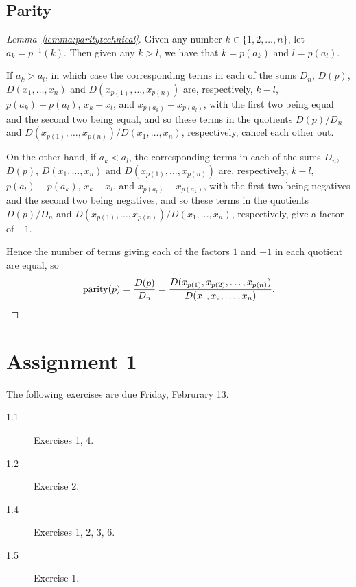 \subsection{Parity}\label{subsection:parity}

\begin{proof}[Lemma~\ref{lemma:paritytechnical}]
  Given any number $k \in \{1, 2, \ldots, n\}$, let $a_{k} = p^{-1}(k)$.
  Then given any $k > l$, we have that $k = p(a_{k})$ and $l = p(a_{l})$.
  
  If $a_{k} > a_{l}$, in which case the corresponding terms in each of the
  sums $D_{n}$, $D(p)$, $D(x_{1}, \ldots, x_{n})$ and $D(x_{p(1)}, \ldots,
  x_{p(n)})$ are, respectively, $k - l$, $p(a_{k}) - p(a_{l})$, $x_{k} - x_{l}$,
  and $x_{p(a_{k})} - x_{p(a_{l})}$, with the first two being equal and the
  second two being equal, and so these terms in the quotients $D(p)/D_{n}$
  and $D(x_{p(1)}, \ldots, x_{p(n)})/D(x_{1}, \ldots, x_{n})$, respectively,
  cancel each other out.

  On the other hand, if $a_{k} < a_{l}$, the corresponding terms in each of the
  sums $D_{n}$, $D(p)$, $D(x_{1}, \ldots, x_{n})$ and $D(x_{p(1)}, \ldots,
  x_{p(n)})$ are, respectively, $k - l$, $p(a_{l}) - p(a_{k})$, $x_{k} - x_{l}$,
  and $x_{p(a_{l})} - x_{p(a_{k})}$, with the first two being negatives and the
  second two being negatives, and so these terms in the quotients $D(p)/D_{n}$
  and $D(x_{p(1)}, \ldots, x_{p(n)})/D(x_{1}, \ldots, x_{n})$, respectively,
  give a factor of $-1$.
  
  Hence the number of terms giving each of the factors $1$ and $-1$ in each
  quotient are equal, so
  \[
    \operatorname{parity}(p) = \frac{D(p)}{D_{n}}
      = \frac{D(x_{p(1)}, x_{p(2)}, \ldots, x_{p(n)})}{D(x_{1}, x_{2}, \ldots, x_{n})}.
  \]
\end{proof}


\newpage
\section*{Assignment 1}

The following exercises are due Friday, Februrary 13.

\begin{description}
  \item[1.1] Exercises 1, 4.
  \item[1.2] Exercise 2.
  \item[1.4] Exercises 1, 2, 3, 6.
  \item[1.5] Exercise 1.
\end{description}
